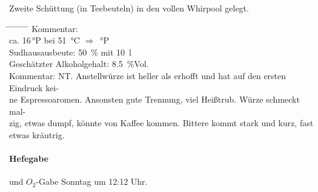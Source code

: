 \documentclass[12pt,oneside,a4paper]{scrartcl}
\begin{document}
\hspace{1cm} Zweite Schüttung (in Teebeuteln) in den vollen Whirpool gelegt.
	\begin{tabbing}
		\hspace{1cm} \= \hspace{1cm} \= \hspace{1cm} \= \hspace{1cm} \= \hspace{1cm} \= \hspace{1cm} \= \hspace{1cm} \= \hspace{1cm} \= \kill
		\> Kommentar: \>\>\>  \\
		\> \> \> ca. 16\,°P \> \> bei \> \SI{51}{\celsius} \> $\Rightarrow$ \,°P\\
		\> \> Sudhausausbeute: \> \> \> \> \>  \SI{50}{\percent} mit \SI{10}{\litre}\\
		\> \> Geschätzter Alkoholgehalt: \> \> \> \> \> \SI{8,5}{\percent}Vol.\\
		\>Kommentar: \>\>\>NT. Anstellwürze ist heller als erhofft und hat auf den ersten Eindruck kei-\\
		\>\>\>ne Espressoaromen. Ansonsten gute Trennung, viel Heißtrub. Würze schmeckt mal-\\
		\>\>\>zig, etwas dumpf, könnte von Kaffee kommen. Bittere kommt stark und kurz, fast\\
		\>\>\>etwas kräutrig.
	\end{tabbing}
%
\paragraph{Hefegabe} und $O_2$-Gabe Sonntag um 12:12 Uhr. 
%
\end{document}
